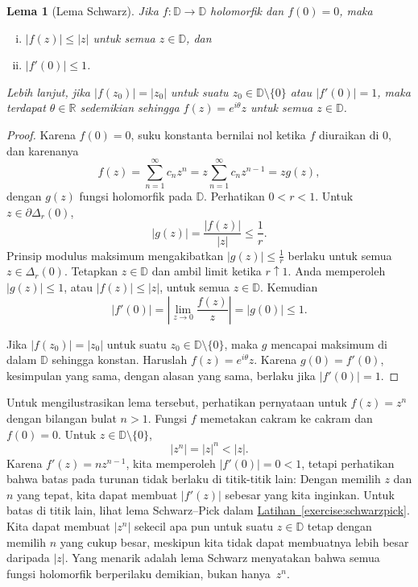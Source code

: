 \documentclass[12pt,openany]{book}
\newcommand{\sabs}[1]{\lvert {#1} \rvert}
\newcommand{\abs}[1]{\left\lvert {#1} \right\rvert}
\newcommand{\R}{{\mathbb{R}}}
\newcommand{\D}{{\mathbb{D}}}
\theoremstyle{plain}
\newtheorem{lemma}[thm]{Lema}
\theoremstyle{remark}
\theoremstyle{definition}
\theoremstyle{exercise}
\theoremstyle{example}
\newcommand{\exerciseref}[1]{\hyperref[#1]{Latihan~\ref*{#1}}}
\begin{document}
\begin{lemma}[Lema Schwarz]\label{lemma:schwarz}
Jika $f \colon \D \to \D$ holomorfik dan $f(0) = 0$,
maka 
\begin{enumerate}[(i)]
\item $\sabs{f(z)} \leq \sabs{z}$ untuk semua $z \in \D$, dan
\item $\sabs{f'(0)} \leq 1$.
\end{enumerate}
Lebih lanjut, jika $\sabs{f(z_0)} = \sabs{z_0}$ untuk suatu $z_0 \in \D \setminus
\{ 0 \}$
atau $\sabs{f'(0)} = 1$, maka
terdapat $\theta \in \R$ sedemikian sehingga $f(z) =
e^{i\theta} z$ untuk semua $z \in \D$.
\end{lemma}

\begin{proof}
Karena $f(0) = 0$, suku konstanta bernilai nol ketika $f$ diuraikan di $0$, dan karenanya
\begin{equation*}
f(z) = \sum_{n=1}^\infty c_n z^n = z \sum_{n=1}^\infty c_n z^{n-1} = z g(z) ,
\end{equation*}
dengan $g(z)$ fungsi holomorfik pada $\D$.
Perhatikan $0 < r < 1$.
Untuk $z \in \partial \Delta_r(0)$,
\begin{equation*}
\sabs{g(z)} = \frac{\sabs{f(z)}}{\sabs{z}} \leq \frac{1}{r}  .
\end{equation*}
Prinsip modulus maksimum mengakibatkan $\sabs{g(z)} \leq \frac{1}{r}$
berlaku untuk semua $z \in \Delta_r(0)$.
Tetapkan $z \in \D$ dan ambil limit ketika $r \uparrow 1$. 
Anda memperoleh
$\sabs{g(z)} \leq 1$,
atau
$\sabs{f(z)} \leq \sabs{z}$,
untuk semua $z \in \D$.  Kemudian
\begin{equation*}
\abs{f'(0)}
=
\abs{\lim_{z \to 0} \frac{f(z)}{z}} = \sabs{g(0)} \leq 1 .
\end{equation*}

Jika $\sabs{f(z_0)} = \sabs{z_0}$ untuk suatu $z_0 \in \D \setminus \{ 0 \}$,
maka $g$ mencapai maksimum di dalam $\D$ sehingga konstan.
Haruslah $f(z) = e^{i \theta} z$.
Karena $g(0) = f'(0)$, kesimpulan yang sama, dengan alasan yang sama,
berlaku jika $\sabs{f'(0)} = 1$.
\end{proof}

Untuk mengilustrasikan lema tersebut, perhatikan pernyataan untuk $f(z) = z^n$
dengan bilangan bulat $n > 1$.  Fungsi $f$ memetakan cakram ke cakram
dan $f(0) = 0$.  Untuk $z \in \D \setminus \{ 0 \}$,
\begin{equation*}
\sabs{z^n} =
\sabs{z}^n < \sabs{z} .
\end{equation*}
Karena $f'(z) = n z^{n-1}$, kita memperoleh
$\sabs{f'(0)} = 0 < 1$, tetapi perhatikan bahwa batas pada turunan
tidak berlaku di titik-titik lain:
Dengan memilih $z$ dan $n$ yang tepat,
kita dapat membuat $\sabs{f'(z)}$ sebesar yang kita inginkan.
Untuk batas di titik lain, lihat lema Schwarz--Pick dalam
\exerciseref{exercise:schwarzpick}.
Kita dapat membuat $\sabs{z^n}$ sekecil apa pun untuk suatu $z \in \D$ tetap dengan memilih
$n$ yang cukup besar, meskipun kita tidak dapat membuatnya lebih besar daripada $\sabs{z}$.  Yang
menarik adalah lema Schwarz menyatakan bahwa semua fungsi holomorfik
berperilaku demikian, bukan hanya~$z^n$.
\end{document}
